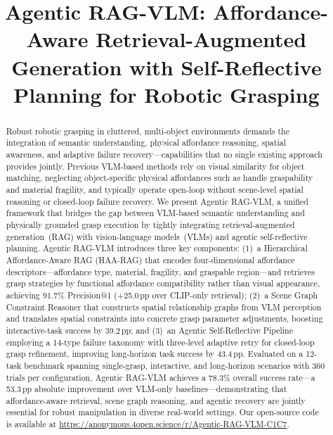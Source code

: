 \documentclass[letterpaper, 10pt, conference]{ieeeconf}
\newcommand{\sysname}{Agentic RAG-VLM}
\newcommand{\haarag}{HAA-RAG}
\begin{document}
\title{\LARGE \bf Agentic RAG-VLM: Affordance-Aware Retrieval-Augmented\\Generation with Self-Reflective Planning for Robotic Grasping}

\author{}

\maketitle
\thispagestyle{empty}
\pagestyle{empty}

\begin{abstract}
Robust robotic grasping in cluttered, multi-object environments demands the integration of semantic understanding, physical affordance reasoning, spatial awareness, and adaptive failure recovery---capabilities that no single existing approach provides jointly.
Previous VLM-based methods rely on visual similarity for object matching, neglecting object-specific physical affordances such as handle graspability and material fragility, and typically operate open-loop without scene-level spatial reasoning or closed-loop failure recovery.
We present \sysname{}, a unified framework that bridges the gap between VLM-based semantic understanding and physically grounded grasp execution by tightly integrating retrieval-augmented generation~(RAG) with vision-language models~(VLMs) and agentic self-reflective planning.
\sysname{} introduces three key components:
(1)~a Hierarchical Affordance-Aware RAG (\haarag{}) that encodes four-dimensional affordance descriptors---affordance type, material, fragility, and graspable region---and retrieves grasp strategies by functional affordance compatibility rather than visual appearance, achieving 91.7\% Precision@1 (+25.0\,pp over CLIP-only retrieval);
(2)~a Scene Graph Constraint Reasoner that constructs spatial relationship graphs from VLM perception and translates spatial constraints into concrete grasp parameter adjustments, boosting interactive-task success by 39.2\,pp;
and (3)~an Agentic Self-Reflective Pipeline employing a 14-type failure taxonomy with three-level adaptive retry for closed-loop grasp refinement, improving long-horizon task success by 43.4\,pp.
Evaluated on a 12-task benchmark spanning single-grasp, interactive, and long-horizon scenarios with 360 trials per configuration, \sysname{} achieves a 78.3\% overall success rate---a 53.3\,pp absolute improvement over VLM-only baselines---demonstrating that affordance-aware retrieval, scene graph reasoning, and agentic recovery are jointly essential for robust manipulation in diverse real-world settings.
Our open-source code is available at {\color{blue}\href{https://anonymous.4open.science/r/Agentic-RAG-VLM-C1C7}{https://anonymous.4open.science/r/Agentic-RAG-VLM-C1C7}}.
\end{abstract}
\end{document}

